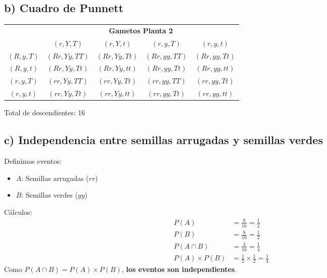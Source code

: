 \documentclass{article}
\begin{document}
	\subsection*{b) Cuadro de Punnett}
	
	\begin{center}
		\renewcommand{\arraystretch}{1.2}
		\begin{tabular}{c|c|c|c|c|}
			\cline{2-5}
			& \multicolumn{4}{c|}{\textbf{Gametos Planta 2}} \\
			\cline{2-5}
			& $(r, Y, T)$ & $(r, Y, t)$ & $(r, y, T)$ & $(r, y, t)$ \\
			\hline
			\multicolumn{1}{|c|}{$(R, y, T)$} & $(Rr, Yy, TT)$ & $(Rr, Yy, Tt)$ & $(Rr, yy, TT)$ & $(Rr, yy, Tt)$ \\
			\hline
			\multicolumn{1}{|c|}{$(R, y, t)$} & $(Rr, Yy, Tt)$ & $(Rr, Yy, tt)$ & $(Rr, yy, Tt)$ & $(Rr, yy, tt)$ \\
			\hline
			\multicolumn{1}{|c|}{$(r, y, T)$} & $(rr, Yy, TT)$ & $(rr, Yy, Tt)$ & $(rr, yy, TT)$ & $(rr, yy, Tt)$ \\
			\hline
			\multicolumn{1}{|c|}{$(r, y, t)$} & $(rr, Yy, Tt)$ & $(rr, Yy, tt)$ & $(rr, yy, Tt)$ & $(rr, yy, tt)$ \\
			\hline
		\end{tabular}
	\end{center}
	Total de descendientes: 16
	
	\subsection*{c) Independencia entre semillas arrugadas y semillas verdes}
	
	Definimos eventos:
	\begin{itemize}
		\item $A$: Semillas arrugadas ($rr$)
		\item $B$: Semillas verdes ($yy$)
	\end{itemize}
	
	Cálculos:
	\begin{align*}
		P(A) &= \frac{8}{16} = \frac{1}{2} \\
		P(B) &= \frac{8}{16} = \frac{1}{2} \\
		P(A \cap B) &= \frac{4}{16} = \frac{1}{4} \\
		P(A) \times P(B) &= \frac{1}{2} \times \frac{1}{2} = \frac{1}{4}
	\end{align*}
	Como $P(A \cap B) = P(A) \times P(B)$, \textbf{los eventos son independientes}.
	
\end{document}
